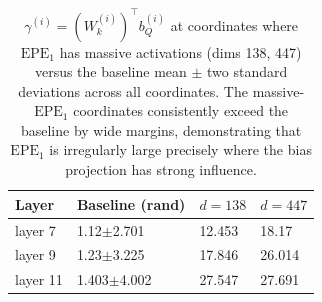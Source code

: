 \documentclass[11pt]{article}
\begin{document}
\begin{table}[t]
  \centering
  \begin{tabular}{llll}
    \hline
    \textbf{Layer} & \textbf{Baseline (rand)} & \textbf{$d{=}138$} & \textbf{$d{=}447$}\\
    \hline
    layer 7   &   1.12$\pm$2.701    &    12.453   &    18.17         \\
    layer 9   &   1.23$\pm$3.225    &    17.846   &    26.014        \\
    layer 11  &   1.403$\pm$4.002   &    27.547   &    27.691        \\
    \hline
  \end{tabular}
  \caption{$\gamma^{(i)}=(W_k^{(i)})^\top b_Q^{(i)}$ at coordinates where $\mathrm{EPE}_1$ has massive activations (dims 138, 447) versus the baseline mean $\pm$ two standard deviations across all coordinates. The massive-$\mathrm{EPE}_1$ coordinates consistently exceed the baseline by wide margins, demonstrating that $\mathrm{EPE}_1$ is irregularly large precisely where the bias projection has strong influence.}
  \label{obs3_table}
\end{table}
\end{document}
